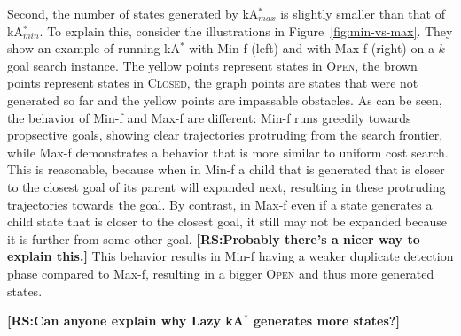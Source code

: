\documentclass{aicom2e}
\newcommand{\kgs}{$k$-goal search}
\newcommand{\kastar}{kA$^*$}
\newcommand{\kastarmin}{kA$^*_{min}$}
\newcommand{\kastarmax}{kA$^*_{max}$}
\newcommand{\minf}{Min-f}
\newcommand{\maxf}{Max-f}
\newcommand{\open}{\textsc{Open}}
\newcommand{\closed}{\textsc{Closed}}
\newcommand{\roni}[1]{\textbf{[RS:#1]}}
\begin{document}
Second, the number of states generated by \kastarmax{} is slightly smaller than that of \kastarmin{}. To explain this, consider the illustrations in Figure~\ref{fig:min-vs-max}. They show an example of running \kastar{} with \minf{} (left) and with \maxf{} (right) on a \kgs{} instance. The yellow points represent states in \open{}, the brown points represent states in \closed{}, the graph points are states that were not generated so far and the yellow points are impassable obstacles. As can be seen, the behavior of \minf{} and \maxf{} are different: \minf{} runs greedily towards propsective goals, showing clear trajectories protruding from the search frontier, while \maxf{} demonstrates a behavior that is more similar to uniform cost search. This is reasonable, because when in \minf{} a child that is generated that is closer to the closest goal of its parent will expanded next, resulting in these protruding trajectories towards the goal. By contrast, in \maxf{} even if a state generates a child state that is closer to the closest goal, it still may not be expanded because it is further from some other goal. \roni{Probably there's a nicer way to explain this.} This behavior results in \minf{} having a weaker duplicate detection phase compared to \maxf{}, resulting in a bigger \open{} and thus more generated states. 

\roni{Can anyone explain why Lazy \kastar{} generates more states?}
\end{document}

